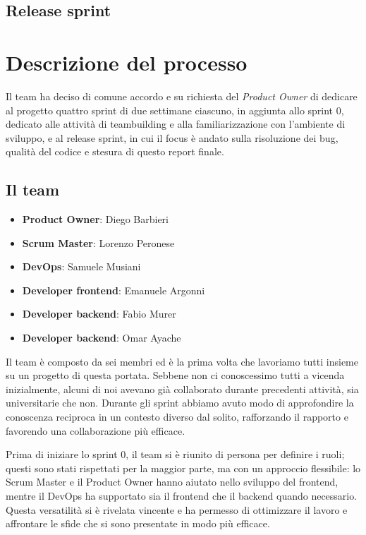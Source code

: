 \documentclass{article}
\begin{document}
\subsection{Release sprint}

\section{Descrizione del processo}

Il team ha deciso di comune accordo e su richiesta del \textit{Product Owner} di dedicare al progetto quattro sprint di due settimane ciascuno, in aggiunta allo sprint 0, dedicato alle attività di teambuilding
e alla familiarizzazione con l'ambiente di sviluppo, e al release sprint, in cui il focus è andato sulla risoluzione dei bug, qualità del codice e stesura di questo report finale.

\subsection{Il team}

\begin{itemize}
    \item \textbf{Product Owner}: Diego Barbieri
    \item \textbf{Scrum Master}: Lorenzo Peronese
    \item \textbf{DevOps}: Samuele Musiani
    \item \textbf{Developer frontend}: Emanuele Argonni
    \item \textbf{Developer backend}: Fabio Murer
    \item \textbf{Developer backend}: Omar Ayache
\end{itemize}

Il team è composto da sei membri ed è la prima volta che lavoriamo tutti insieme su un progetto di questa portata. Sebbene non ci conoscessimo tutti a vicenda inizialmente, 
alcuni di noi avevano già collaborato durante precedenti attività, sia universitarie che non. Durante gli sprint abbiamo avuto modo 
di approfondire la conoscenza reciproca in un contesto diverso dal solito, rafforzando il rapporto e favorendo una collaborazione più efficace. \par
Prima di iniziare lo sprint 0, il team si è riunito di persona per definire i ruoli; questi sono stati rispettati per la maggior parte, ma con un approccio flessibile: 
lo Scrum Master e il Product Owner hanno aiutato nello sviluppo del frontend, mentre il DevOps ha supportato sia il frontend che il backend quando necessario. 
Questa versatilità si è rivelata vincente e ha permesso di ottimizzare il lavoro e affrontare le sfide che si sono presentate in modo più efficace.
\end{document}
